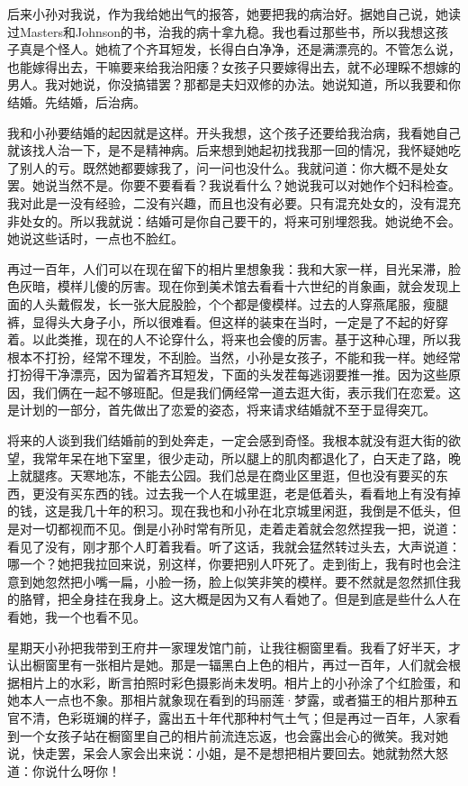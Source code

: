 后来小孙对我说，作为我给她出气的报答，她要把我的病治好。据她自己说，她读过Masters和Johnson的书，治我的病十拿九稳。我也看过那些书，所以我想这孩子真是个怪人。她梳了个齐耳短发，长得白白净净，还是满漂亮的。不管怎么说，也能嫁得出去，干嘛要来给我治阳痿？女孩子只要嫁得出去，就不必理睬不想嫁的男人。我对她说，你没搞错罢？那都是夫妇双修的办法。她说知道，所以我要和你结婚。先结婚，后治病。 

我和小孙要结婚的起因就是这样。开头我想，这个孩子还要给我治病，我看她自己就该找人治一下，是不是精神病。后来想到她起初找我那一回的情况，我怀疑她吃了别人的亏。既然她都要嫁我了，问一问也没什么。我就问道：你大概不是处女罢。她说当然不是。你要不要看看？我说看什么？她说我可以对她作个妇科检查。我对此是一没有经验，二没有兴趣，而且也没有必要。只有混充处女的，没有混充非处女的。所以我就说：结婚可是你自己要干的，将来可别埋怨我。她说绝不会。她说这些话时，一点也不脸红。 

再过一百年，人们可以在现在留下的相片里想象我：我和大家一样，目光呆滞，脸色灰暗，模样儿傻的厉害。现在你到美术馆去看看十六世纪的肖象画，就会发现上面的人头戴假发，长一张大屁股脸，个个都是傻模样。过去的人穿燕尾服，瘦腿裤，显得头大身子小，所以很难看。但这样的装束在当时，一定是了不起的好穿着。以此类推，现在的人不论穿什么，将来也会傻的厉害。基于这种心理，所以我根本不打扮，经常不理发，不刮脸。当然，小孙是女孩子，不能和我一样。她经常打扮得干净漂亮，因为留着齐耳短发，下面的头发茬每逃诩要推一推。因为这些原因，我们俩在一起不够班配。但是我们俩经常一道去逛大街，表示我们在恋爱。这是计划的一部分，首先做出了恋爱的姿态，将来请求结婚就不至于显得突兀。 

将来的人谈到我们结婚前的到处奔走，一定会感到奇怪。我根本就没有逛大街的欲望，我常年呆在地下室里，很少走动，所以腿上的肌肉都退化了，白天走了路，晚上就腿疼。天寒地冻，不能去公园。我们总是在商业区里逛，但也没有要买的东西，更没有买东西的钱。过去我一个人在城里逛，老是低着头，看看地上有没有掉的钱，这是我几十年的积习。现在我也和小孙在北京城里闲逛，我倒是不低头，但是对一切都视而不见。倒是小孙时常有所见，走着走着就会忽然捏我一把，说道：看见了没有，刚才那个人盯着我看。听了这话，我就会猛然转过头去，大声说道：哪一个？她把我拉回来说，别这样，你要把别人吓死了。走到街上，我有时也会注意到她忽然把小嘴一扁，小脸一扬，脸上似笑非笑的模样。要不然就是忽然抓住我的胳臂，把全身挂在我身上。这大概是因为又有人看她了。但是到底是些什么人在看她，我一个也看不见。 

星期天小孙把我带到王府井一家理发馆门前，让我往橱窗里看。我看了好半天，才认出橱窗里有一张相片是她。那是一辐黑白上色的相片，再过一百年，人们就会根据相片上的水彩，断言拍照时彩色摄影尚未发明。相片上的小孙涂了个红脸蛋，和她本人一点也不象。那相片就象现在看到的玛丽莲·梦露，或者猫王的相片那种五官不清，色彩斑斓的样子，露出五十年代那种村气土气；但是再过一百年，人家看到一个女孩子站在橱窗里自己的相片前流连忘返，也会露出会心的微笑。我对她说，快走罢，呆会人家会出来说：小姐，是不是想把相片要回去。她就勃然大怒道：你说什么呀你！ 

